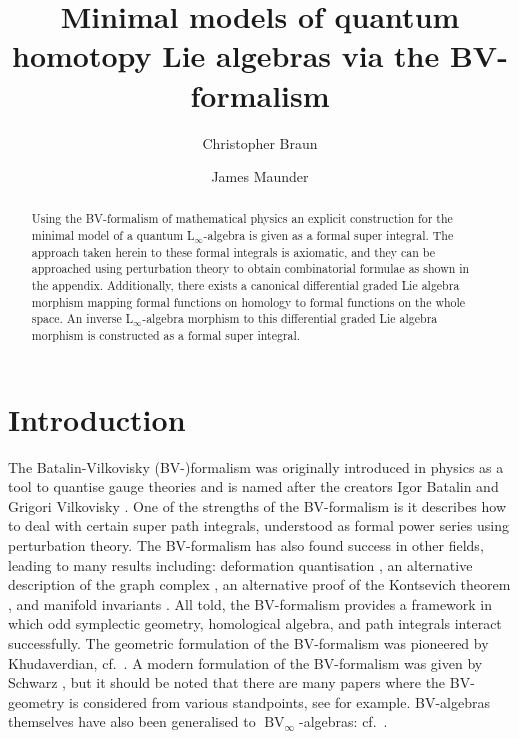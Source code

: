 \documentclass[]{amsart}
\title[Minimal models of quantum \Linf-algebras via the BV-formalism]{Minimal models of quantum homotopy Lie algebras via the BV-formalism}
\author{Christopher Braun}
\author{James Maunder}
\theoremstyle{definition}
\newcommand{\Linf}{L$_\infty$}
\begin{document}
\begin{abstract}
Using the BV-formalism of mathematical physics an explicit construction for the minimal model of a quantum \Linf-algebra is given as a formal super integral. The approach taken herein to these formal integrals is axiomatic, and they can be approached using perturbation theory to obtain combinatorial formulae as shown in the appendix. Additionally, there exists a canonical differential graded Lie algebra morphism mapping formal functions on homology to formal functions on the whole space. An inverse \Linf-algebra morphism to this differential graded Lie algebra morphism is constructed as a formal super integral.
\end{abstract}

\maketitle

\section*{Introduction}

The Batalin-Vilkovisky (BV-)formalism was originally introduced in physics as a tool to quantise gauge theories and is named after the creators Igor Batalin and Grigori Vilkovisky \cite{batalin_vilkovisky_gauge_algebra_quantization,batalin_vilkovisky_quantization_of_gauge_algebras}. One of the strengths of the BV-formalism is it describes how to deal with certain super path integrals, understood as formal power series using perturbation theory. The BV-formalism has also found success in other fields, leading to many results including: deformation quantisation \cite{cattaneo_felder_deformation}, an alternative description of the graph complex \cite{hamilton_laz_graph}, an alternative proof of the Kontsevich theorem \cite{intro_to_graded_geo_BV_formalism_and_applications}, and manifold invariants \cite{cattaneo_mnev}. All told, the BV-formalism provides a framework in which odd symplectic geometry, homological algebra, and path integrals interact successfully. The geometric formulation of the BV-formalism was pioneered by Khudaverdian, cf.~\cite{khudaverdian_semidensities,khudaverdian_geometry_of_superspace,khudaverdian_BV_and_odd_symp_geo,khudaverdian_nersessian}. A modern formulation of the BV-formalism was given by Schwarz \cite{schwarz}, but it should be noted that there are many papers where the BV-geometry is considered from various standpoints, see \cite{getzler_BV,khudaverdian_semidensities,khudaverdian_voronov,kosmann-schwazbach_monterde,severa} for example. BV-algebras themselves have also been generalised to $\operatorname{BV}_\infty$-algebras: cf.\ \cite{bashkirov,braun_laz_homotopy_BV,homotopy_BV_algebras,kravchenko_defo_BV_algebras}.
\end{document}

